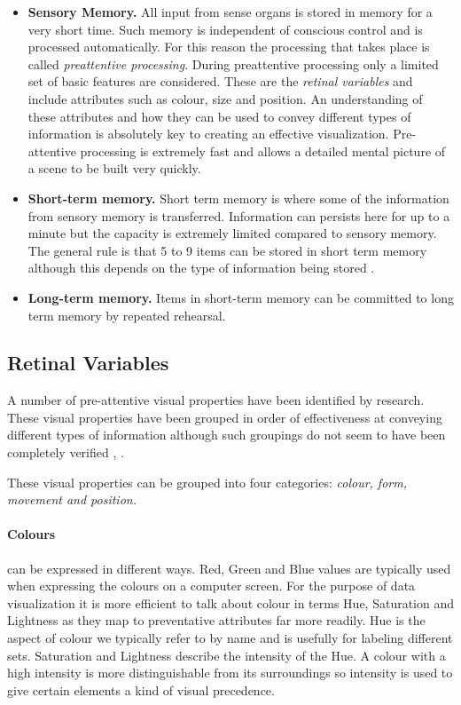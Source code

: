 \documentclass[a4paper, 11pt, titlepage, onehalfspacing]{report}
\begin{document}
\begin{itemize}
\item \textbf{Sensory Memory.} All input from sense organs is stored in memory for a very short time. Such memory is independent of conscious control and is processed automatically. For this reason the processing that takes place is called \textit{preattentive processing}. During preattentive processing only a limited set of basic features are considered. These are the \textit{retinal variables} and include attributes such as colour, size and position. An understanding of these attributes and how they can be used to convey different types of information is absolutely key to creating an effective visualization. Pre-attentive processing is extremely fast and allows a detailed mental picture of a scene to be built very quickly.
\item \textbf{Short-term memory.} Short term memory is where some of the information from sensory memory is transferred. Information can persists here for up to a minute but the capacity is extremely limited compared to sensory memory. The general rule is that 5 to 9 items can be stored in short term memory although this depends on the type of information being stored \cite{Mil56}.
\item \textbf{Long-term memory.} Items in short-term memory can be committed to long term memory by repeated rehearsal.
\end{itemize}

\subsection{Retinal Variables}
A number of pre-attentive visual properties have been identified by research. These visual properties have been grouped in order of effectiveness at conveying different types of information although such groupings do not seem to have been completely verified \cite{mackinlay1986automating}, \cite{mazza2009introduction}. 

These visual properties can be grouped into four categories: \textit{colour, form, movement and position.} 

\paragraph{Colours}can be expressed in different ways. Red, Green and Blue values are typically used when expressing the colours on a computer screen. For the purpose of data visualization it is more efficient to talk about colour in terms Hue, Saturation and Lightness as they map to preventative attributes far more readily. Hue is the aspect of colour we typically refer to by name and is usefully for labeling different sets. Saturation and Lightness describe the intensity of the Hue. A colour with a high intensity is more distinguishable from its surroundings so intensity is used to give certain elements a kind of visual precedence.
\end{document}
